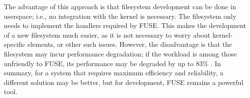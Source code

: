 The advantage of this approach is that filesystem development can be done in userspace; i.e., no integration with the kernel is necessary.
The filesystem only needs to implement the handlers required by FUSE.
This makes the development of a new filesystem much easier, as it is not necessary to worry about kernel-specific elements, or other such issues.
However, the disadvantage is that the filesystem may incur performance degradation; if the workload is among those unfriendly to FUSE, its performance may be degraded by up to 83\% \cite{vangoor2017}.
In summary, for a system that requires maximum efficiency and reliability, a different solution may be better, but for development, FUSE remains a powerful tool.
